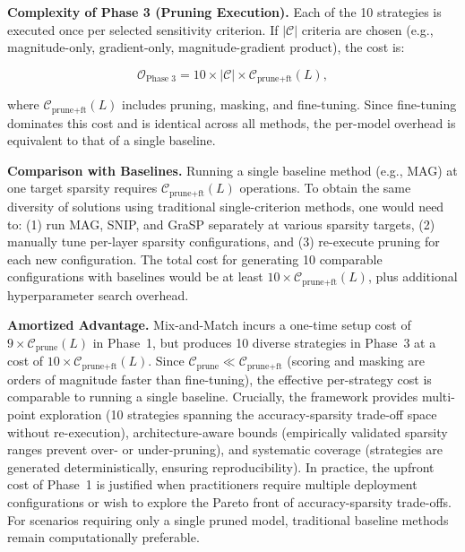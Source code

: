 \documentclass[11pt, conference]{IEEEtran}
\begin{document}
\textbf{Complexity of Phase 3 (Pruning Execution).}
Each of the 10 strategies is executed once per selected sensitivity criterion. If $|\mathcal{C}|$ criteria are chosen (e.g., magnitude-only, gradient-only, magnitude-gradient product), the cost is:

\begin{equation}
\mathcal{O}_{\text{Phase 3}} = 10 \times |\mathcal{C}| \times \mathcal{C}_{\text{prune+ft}}(L),
\end{equation}

where $\mathcal{C}_{\text{prune+ft}}(L)$ includes pruning, masking, and fine-tuning. Since fine-tuning dominates this cost and is identical across all methods, the per-model overhead is equivalent to that of a single baseline.

\textbf{Comparison with Baselines.}
Running a single baseline method (e.g., MAG) at one target sparsity requires $\mathcal{C}_{\text{prune+ft}}(L)$ operations. To obtain the same diversity of solutions using traditional single-criterion methods, one would need to: (1) run MAG, SNIP, and GraSP separately at various sparsity targets, (2) manually tune per-layer sparsity configurations, and (3) re-execute pruning for each new configuration. The total cost for generating 10 comparable configurations with baselines would be at least $10 \times \mathcal{C}_{\text{prune+ft}}(L)$, plus additional hyperparameter search overhead.

\textbf{Amortized Advantage.}
Mix-and-Match incurs a one-time setup cost of $9 \times \mathcal{C}_{\text{prune}}(L)$ in Phase~1, but produces 10 diverse strategies in Phase~3 at a cost of $10 \times \mathcal{C}_{\text{prune+ft}}(L)$. Since $\mathcal{C}_{\text{prune}} \ll \mathcal{C}_{\text{prune+ft}}$ (scoring and masking are orders of magnitude faster than fine-tuning), the effective per-strategy cost is comparable to running a single baseline. Crucially, the framework provides multi-point exploration (10 strategies spanning the accuracy-sparsity trade-off space without re-execution), architecture-aware bounds (empirically validated sparsity ranges prevent over- or under-pruning), and systematic coverage (strategies are generated deterministically, ensuring reproducibility). In practice, the upfront cost of Phase~1 is justified when practitioners require multiple deployment configurations or wish to explore the Pareto front of accuracy-sparsity trade-offs. For scenarios requiring only a single pruned model, traditional baseline methods remain computationally preferable.
\end{document}
